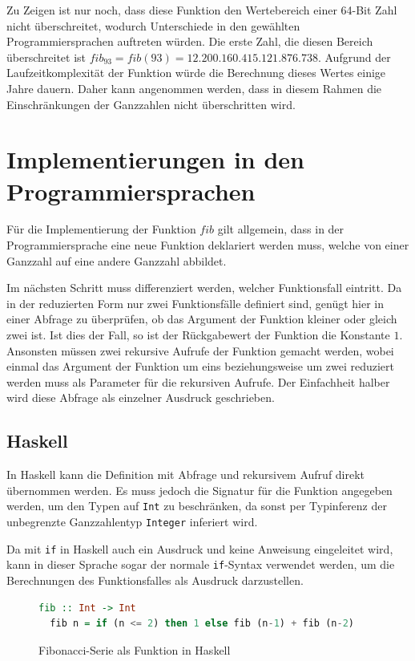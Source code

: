 \documentclass[11pt, parskip=half]{scrartcl}       %
\begin{document}
Zu Zeigen ist nur noch, dass diese Funktion den Wertebereich einer 64-Bit Zahl nicht überschreitet, wodurch Unterschiede in den gewählten Programmiersprachen auftreten würden. Die erste Zahl, die diesen Bereich überschreitet ist $fib_{93} = fib(93) = 12.200.160.415.121.876.738$. Aufgrund der Laufzeitkomplexität der Funktion würde die Berechnung dieses Wertes einige Jahre dauern. Daher kann angenommen werden, dass in diesem Rahmen die Einschränkungen der Ganzzahlen nicht überschritten wird. 

\section{Implementierungen in den Programmiersprachen}

Für die Implementierung der Funktion $fib$ gilt allgemein, dass in der Programmiersprache eine neue Funktion deklariert werden muss, welche von einer Ganzzahl auf eine andere Ganzzahl abbildet.

Im nächsten Schritt muss differenziert werden, welcher Funktionsfall eintritt.
Da in der reduzierten Form nur zwei Funktionsfälle definiert sind, genügt hier in einer Abfrage zu überprüfen, ob  das Argument der Funktion kleiner oder gleich zwei ist.
Ist dies der Fall, so ist der Rückgabewert der Funktion die Konstante $1$.
Ansonsten müssen zwei rekursive Aufrufe der Funktion gemacht werden, wobei einmal das Argument der Funktion um eins beziehungsweise um zwei reduziert werden muss als Parameter für die rekursiven Aufrufe.
Der Einfachheit halber wird diese Abfrage als einzelner Ausdruck geschrieben.

\subsection{Haskell}

In Haskell kann die Definition mit Abfrage und rekursivem Aufruf direkt übernommen werden.
Es muss jedoch die Signatur für die Funktion angegeben werden, um den Typen auf \texttt{Int} zu beschränken, da sonst per Typinferenz der unbegrenzte Ganzzahlentyp \texttt{Integer} inferiert wird.

Da mit \texttt{if} in Haskell auch ein Ausdruck und keine Anweisung eingeleitet wird, kann in dieser Sprache sogar der normale \texttt{if}-Syntax verwendet werden, um die Berechnungen des Funktionsfalles als Ausdruck darzustellen.

\begin{figure}[h]
  \centering
\begin{lstlisting}[language=haskell]
  fib :: Int -> Int
  fib n = if (n <= 2) then 1 else fib (n-1) + fib (n-2)
\end{lstlisting}  
  \caption{Fibonacci-Serie als Funktion in Haskell}
  \label{fig:code-haskell}
\end{figure}
\end{document}
